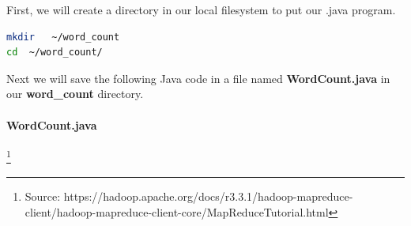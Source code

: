 \documentclass[12pt,english]{book}
\begin{document}
First, we will create a directory in our local filesystem to put our .java program.

\begin{lstlisting}[language=bash, frame=single]
mkdir   ~/word_count
cd  ~/word_count/
\end{lstlisting}

Next we will save the following Java code in a file named \textbf{WordCount.java} in our \textbf{word\_count} directory.

\paragraph{WordCount.java} \footnote{Source: https://hadoop.apache.org/docs/r3.3.1/hadoop-mapreduce-client/hadoop-mapreduce-client-core/MapReduceTutorial.html}
\end{document}
